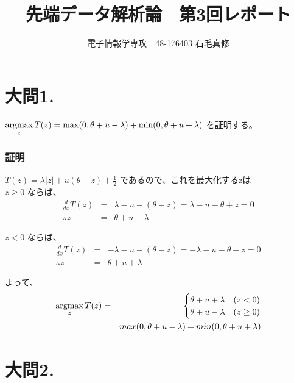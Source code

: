 \documentclass[fleqn]{jsarticle}
\begin{document}
\newcommand{\argmax}{\mathop{\rm argmax}\limits}

\title{先端データ解析論　第3回レポート}
\author{電子情報学専攻　48-176403 石毛真修}
\maketitle



\section*{大問1.}
$\argmax_{z} T(z) = \max(0, \theta + u - \lambda) + \min(0, \theta + u + \lambda)$
を証明する。

\subsubsection*{証明}
$T(z) = \lambda |z| + u (\theta - z) + \frac{1}{2}$ であるので、これを最大化するzは\\
$z \geq 0$ ならば、
\begin{eqnarray*}
  \frac{d}{dx} T(z) &=& \lambda - u - (\theta - z) = \lambda - u - \theta + z = 0\\
  \therefore z &=& \theta + u - \lambda
\end{eqnarray*}

$z < 0$ ならば、
\begin{eqnarray*}
  \frac{d}{dx} T(z) &=& - \lambda - u - (\theta - z) = - \lambda - u - \theta + z = 0\\
  \therefore z &=& \theta + u + \lambda
\end{eqnarray*}

よって、
\begin{eqnarray*}
  \argmax_{z} T(z) &=& \begin{cases}
    \theta + u + \lambda &(z < 0)\\
    \theta + u - \lambda &(z \geq 0)\\
  \end{cases}\\
  &=& max(0, \theta + u - \lambda) + min(0, \theta + u + \lambda)\\
\end{eqnarray*}







\section*{大問2.}
\end{document}
